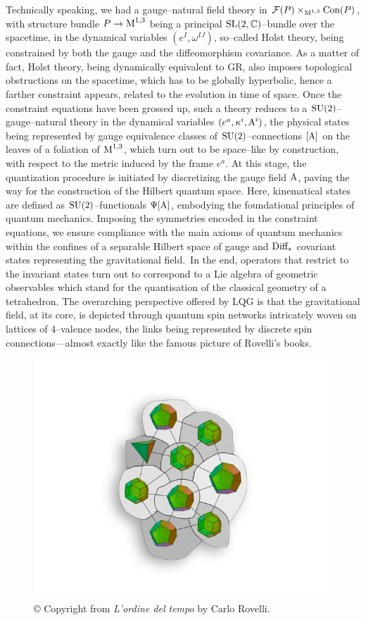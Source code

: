 Technically speaking, we had a gauge--natural field theory in $\mathcal{F}(P)\times_{\text{\normalfont M}^{1,3}}\text{\normalfont Con}(P)$, with structure bundle $P\to\text{\normalfont M}^{1,3}$ being a principal $\text{\normalfont SL}(2,\mathbb{C})$--bundle over the spacetime, in the dynamical variables $(e^I,\omega^{IJ})$, so--called Holst theory, being constrained by both the gauge and the diffeomorphism covariance. As a matter of fact, Holst theory, being dynamically equivalent to GR, also imposes topological obstructions on the spacetime, which has to be globally hyperbolic, hence a farther constraint appears, related to the evolution in time of space. Once the constraint equations have been grossed up, such a theory reduces to a $\text{\normalfont SU}(2)$--gauge--natural theory in the dynamical variables $(e^a,\kappa^i,\text{\normalfont A}^i)$, the physical states being represented by gauge equivalence classes of $\text{\normalfont SU}(2)$--connections $[\text{\normalfont A}]$ on the leaves of a foliation of $\text{\normalfont M}^{1,3}$, which turn out to be space--like by construction, with respect to the metric induced by the frame $e^a$. At this stage, the quantization procedure is initiated by discretizing the gauge field $\text{\normalfont A}$, paving the way for the construction of the Hilbert quantum space. Here, kinematical states are defined as $\text{\normalfont SU}(2)$--functionals $\Psi[\text{\normalfont A}]$, embodying the foundational principles of quantum mechanics. Imposing the symmetries encoded in the constraint equations, we ensure compliance with the main axioms of quantum mechanics within the confines of a separable Hilbert space of gauge and $\text{\normalfont Diff}_*$ covariant states representing the gravitational field.\, In the end, operators that restrict to the invariant states turn out to correspond to a Lie algebra of geometric observables which stand for the quantisation of the classical geometry of a tetrahedron. The overarching perspective offered by LQG is that the gravitational field, at its core, is depicted through quantum spin networks intricately woven on lattices of $4$--valence nodes, the links being represented by discrete spin connections---almost exactly like the famous picture of Rovelli's books.
\begin{figure}[ht]
    \centering
    \includegraphics[scale=1.4]{images/spin_networks.png}
    \caption{© Copyright from \emph{L'ordine del tempo} by Carlo Rovelli.}
\end{figure}


